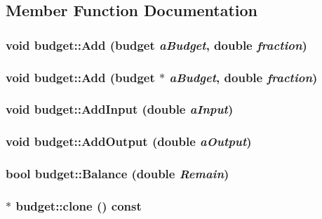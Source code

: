 \subsection{Member Function Documentation}
\hypertarget{classbudget_a2f378ac0b5f670cc9ec42b4e9ceb3c51}{
\subsubsection[{Add}]{\setlength{\rightskip}{0pt plus 5cm}void budget::Add ({\bf budget} {\em aBudget}, \/  double {\em fraction})}}
\label{classbudget_a2f378ac0b5f670cc9ec42b4e9ceb3c51}
\hypertarget{classbudget_aa775844e174ace198419686907472ae4}{
\subsubsection[{Add}]{\setlength{\rightskip}{0pt plus 5cm}void budget::Add ({\bf budget} $\ast$ {\em aBudget}, \/  double {\em fraction})}}
\label{classbudget_aa775844e174ace198419686907472ae4}
\hypertarget{classbudget_ad619d773e77931df0435e8c08314f68e}{
\subsubsection[{AddInput}]{\setlength{\rightskip}{0pt plus 5cm}void budget::AddInput (double {\em aInput})}}
\label{classbudget_ad619d773e77931df0435e8c08314f68e}
\hypertarget{classbudget_a47bfa9740186f2be18a10dd3423a5eea}{
\subsubsection[{AddOutput}]{\setlength{\rightskip}{0pt plus 5cm}void budget::AddOutput (double {\em aOutput})}}
\label{classbudget_a47bfa9740186f2be18a10dd3423a5eea}
\hypertarget{classbudget_a2814c71d2d504462defc2c85f2cd86b2}{
\subsubsection[{Balance}]{\setlength{\rightskip}{0pt plus 5cm}bool budget::Balance (double {\em Remain})}}
\label{classbudget_a2814c71d2d504462defc2c85f2cd86b2}
\hypertarget{classbudget_a5e9d9a8fdb2a2c1f462208f054a04499}{
\subsubsection[{clone}]{ $\ast$ budget::clone () const}}
